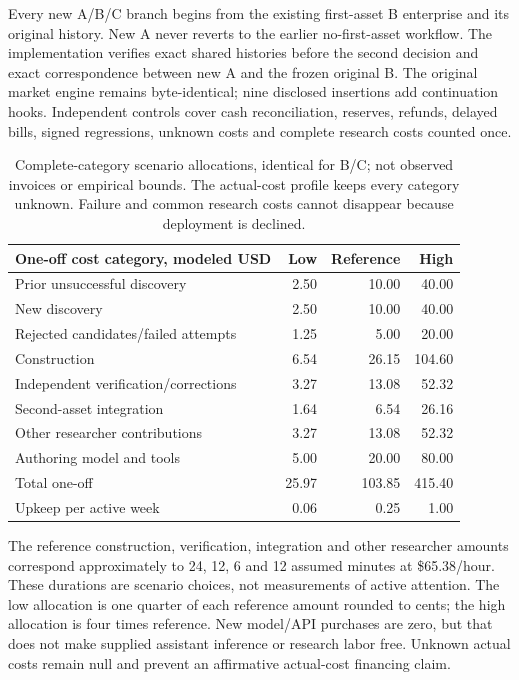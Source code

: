 \documentclass[11pt,letterpaper]{article}
\newcommand{\USD}[1]{\$#1}
\begin{document}
Every new A/B/C branch begins from the existing first-asset B enterprise and its original history. New A never reverts to the earlier no-first-asset workflow. The implementation verifies exact shared histories before the second decision and exact correspondence between new A and the frozen original B. The original market engine remains byte-identical; nine disclosed insertions add continuation hooks. Independent controls cover cash reconciliation, reserves, refunds, delayed bills, signed regressions, unknown costs and complete research costs counted once.

\begin{table}[htbp]
\centering\small
\begin{tabular}{@{}lrrr@{}}
\toprule
One-off cost category, modeled USD & Low & Reference & High \\
\midrule
Prior unsuccessful discovery & 2.50 & 10.00 & 40.00 \\
New discovery & 2.50 & 10.00 & 40.00 \\
Rejected candidates/failed attempts & 1.25 & 5.00 & 20.00 \\
Construction & 6.54 & 26.15 & 104.60 \\
Independent verification/corrections & 3.27 & 13.08 & 52.32 \\
Second-asset integration & 1.64 & 6.54 & 26.16 \\
Other researcher contributions & 3.27 & 13.08 & 52.32 \\
Authoring model and tools & 5.00 & 20.00 & 80.00 \\
\midrule
Total one-off & 25.97 & 103.85 & 415.40 \\
Upkeep per active week & 0.06 & 0.25 & 1.00 \\
\bottomrule
\end{tabular}
\caption{Complete-category scenario allocations, identical for B/C; not observed invoices or empirical bounds. The actual-cost profile keeps every category unknown. Failure and common research costs cannot disappear because deployment is declined.}
\end{table}

The reference construction, verification, integration and other researcher amounts correspond approximately to 24, 12, 6 and 12 assumed minutes at \USD{65.38}/hour. These durations are scenario choices, not measurements of active attention. The low allocation is one quarter of each reference amount rounded to cents; the high allocation is four times reference. New model/API purchases are zero, but that does not make supplied assistant inference or research labor free. Unknown actual costs remain null and prevent an affirmative actual-cost financing claim.
\end{document}
